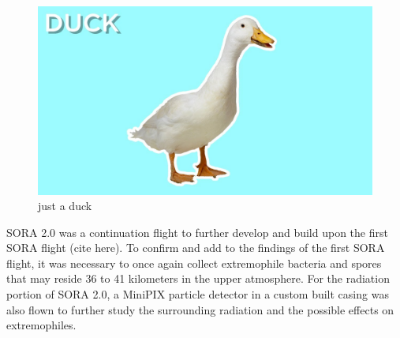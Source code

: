 \begin{figure}[h!]
  \begin{center}
      \includegraphics[width=\textwidth]{./figures/duck.jpg}
      \caption{just a duck}
      \label{fig:duck}
  \end{center}
\end{figure}

SORA 2.0 was a continuation flight to further develop and build upon the first SORA flight (cite here).  To confirm and add to the findings of the first SORA flight, it was necessary to once again collect extremophile bacteria and spores that may reside 36 to 41 kilometers in the upper atmosphere.  For the radiation portion of SORA 2.0, a MiniPIX particle detector in a custom built casing was also flown to further study the surrounding radiation and the possible effects on extremophiles.  



